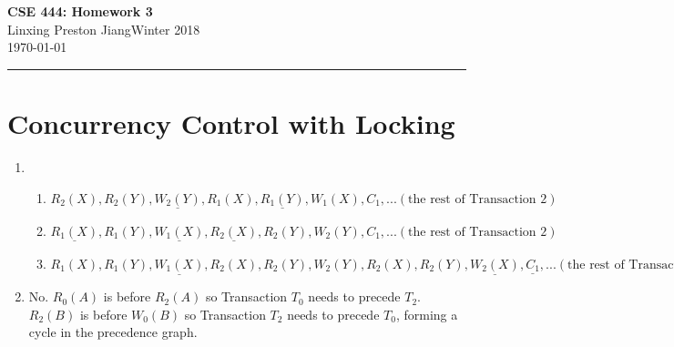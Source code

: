 \documentclass[10pt]{article}
\newcommand{\myname}{Linxing Preston Jiang}
\newcommand{\quarter}{Winter 2018}
\newcommand{\myhwname}{\textbf{CSE 444: Homework 3}}
\begin{document}
\begin{center}
	{\Large \myhwname} \\
	\vspace{.05in} 
    \myname\quad\quarter \\
	\vspace{.05in} 
    \today \\
\end{center}
\vspace{.15in} \hrule \vspace{0.5em}%

\section{Concurrency Control with Locking}
	\begin{enumerate}
		\item
		\begin{enumerate}[label=(\alph*)]
			\item $R_2(X), R_2(Y), \underline{W_2(Y)}, R_1(X), \underline{R_1(Y)}, W_1(X), C_1, ... (\text{the rest of
				Transaction 2})$
			\item $\underline{R_1(X)}, R_1(Y), \underline{W_1(X)}, \underline{R_2(X)}, R_2(Y), W_2(Y), C_1, ...
				(\text{the rest of Transaction 2})$
            \item $R_1(X), R_1(Y), \underline{W_1(X)}, R_2(X), R_2(Y), W_2(Y), R_2(X), R_2(Y), \underline{W_2(X)},
				\underline{C_1}, ... (\text{the rest of Transaction 2})$
		\end{enumerate}

		\item No. $R_0(A)$ is before $R_2(A)$ so Transaction $T_0$ needs to precede $T_2$. $R_2(B)$ is before $W_0(B)$
			so Transaction $T_2$ needs to precede $T_0$, forming a cycle in the precedence graph.


\end{enumerate}
\end{document}
